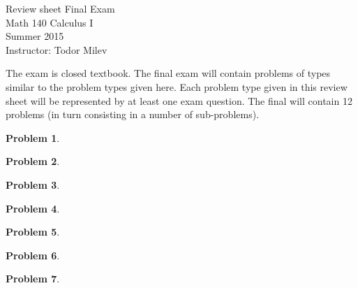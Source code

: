 \documentclass{article}
\newtheorem{problem}{Problem}
\begin{document}
\begin{center}
\Large
Review sheet Final Exam \\ Math 140 Calculus I \\ \normalsize Summer 2015 \\ Instructor: Todor Milev
\end{center}



\noindent The exam is closed textbook. The final exam will contain problems of types similar to the problem types given here. Each problem type given in this review sheet will be represented by at least one exam question. The final will contain 12 problems (in turn consisting in a number of sub-problems). 

\begin{problem}

\end{problem}

\begin{problem}

\end{problem}


\begin{problem}

\end{problem}


\begin{problem}

\end{problem}


\begin{problem}

\end{problem}
\begin{problem}

\end{problem}
\begin{problem}

\end{problem}

\end{document}
